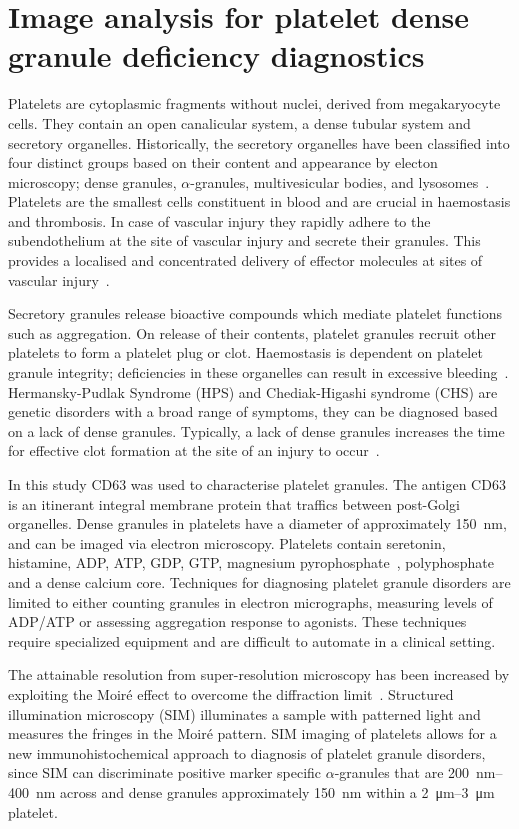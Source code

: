 \chapter{Image analysis for platelet dense granule deficiency diagnostics}
\ifpdf
    \graphicspath{{chapter_3/figs/}}
\fi
Platelets are cytoplasmic fragments without nuclei, derived from megakaryocyte cells. They contain an open canalicular system, a dense tubular system and secretory organelles. Historically, the secretory organelles have been classified into four distinct groups based on their content and appearance by electon microscopy; dense granules, $\alpha$-granules, multivesicular bodies, and lysosomes~\cite{VanNispenTotPannerden2010}. Platelets are the smallest cells constituent in blood and are crucial in haemostasis and thrombosis. In case of vascular injury they rapidly adhere to the subendothelium at the site of vascular injury and secrete their granules. This provides a localised and concentrated delivery of effector molecules at sites of vascular injury~\cite{Reed2000}.

Secretory granules release bioactive compounds which mediate platelet functions such as aggregation. On release of their contents, platelet granules recruit other platelets to form a platelet plug or clot. Haemostasis is dependent on platelet granule integrity; deficiencies in these organelles can result in excessive bleeding~\cite{Nurden2014}. Hermansky-Pudlak Syndrome (HPS) and Chediak-Higashi syndrome (CHS) are genetic disorders with a broad range of symptoms, they can be diagnosed based on a lack of dense granules. Typically, a lack of dense granules increases the time for effective clot formation at the site of an injury to occur~\cite{Seward2013}.

In this study CD63 was used to characterise platelet granules. The antigen CD63 is an itinerant integral membrane protein that traffics between post-Golgi organelles. Dense granules in platelets have a diameter of approximately \SI{150}{\nano\meter}, and can be imaged via electron microscopy. Platelets contain seretonin, histamine, ADP, ATP, GDP, GTP, magnesium pyrophosphate~\cite{Rendu2001}, polyphosphate~\cite{Ruiz2004} and a dense calcium core. Techniques for diagnosing platelet granule disorders are limited to either counting granules in electron micrographs, measuring levels of ADP/ATP or assessing aggregation response to agonists. These techniques require specialized equipment and are difficult to automate in a clinical setting.

The attainable resolution from super-resolution microscopy has been increased by exploiting the Moir\'e effect to overcome the diffraction limit~\cite{Gustafsson2005}. Structured illumination microscopy (SIM) illuminates a sample with patterned light and measures the fringes in the Moir\'e pattern. SIM imaging of platelets allows for a new immunohistochemical approach to diagnosis of platelet granule disorders, since SIM can discriminate positive marker specific $\alpha$-granules that are \SIrange{200}{400}{\nano\meter} across and dense granules approximately \SI{150}{\nano\meter} within a \SIrange{2}{3}{\micro\meter} platelet.

